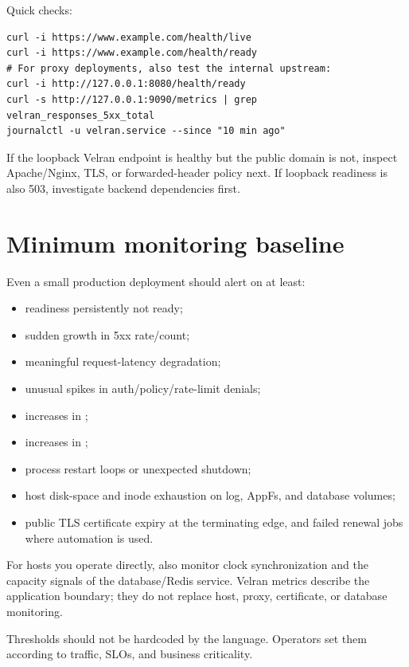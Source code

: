 Quick checks:

\begin{lstlisting}
curl -i https://www.example.com/health/live
curl -i https://www.example.com/health/ready
# For proxy deployments, also test the internal upstream:
curl -i http://127.0.0.1:8080/health/ready
curl -s http://127.0.0.1:9090/metrics | grep velran_responses_5xx_total
journalctl -u velran.service --since "10 min ago"
\end{lstlisting}

If the loopback Velran endpoint is healthy but the public domain is not, inspect Apache/Nginx, TLS, or forwarded-header policy next. If loopback readiness is also 503, investigate backend dependencies first.

\section{Minimum monitoring baseline}

Even a small production deployment should alert on at least:

\begin{itemize}
  \item readiness persistently not ready;
  \item sudden growth in 5xx rate/count;
  \item meaningful request-latency degradation;
  \item unusual spikes in auth/policy/rate-limit denials;
  \item increases in ;
  \item increases in ;
  \item process restart loops or unexpected shutdown;
  \item host disk-space and inode exhaustion on log, AppFs, and database volumes;
  \item public TLS certificate expiry at the terminating edge, and failed renewal jobs where automation is used.
\end{itemize}

For hosts you operate directly, also monitor clock synchronization and the capacity signals of the database/Redis service. Velran metrics describe the application boundary; they do not replace host, proxy, certificate, or database monitoring.

Thresholds should not be hardcoded by the language. Operators set them according to traffic, SLOs, and business criticality.

